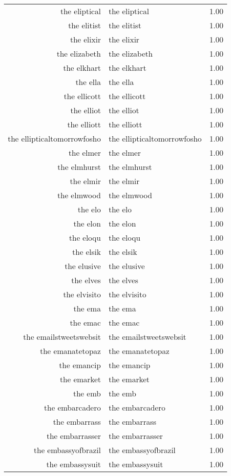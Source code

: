 \begin{table}[ht]
\begin{tabular}{rlr}
  the eliptical & the eliptical & 1.00 \\ 
  the elitist & the elitist & 1.00 \\ 
  the elixir & the elixir & 1.00 \\ 
  the elizabeth & the elizabeth & 1.00 \\ 
  the elkhart & the elkhart & 1.00 \\ 
  the ella & the ella & 1.00 \\ 
  the ellicott & the ellicott & 1.00 \\ 
  the elliot & the elliot & 1.00 \\ 
  the elliott & the elliott & 1.00 \\ 
  the ellipticaltomorrowfosho & the ellipticaltomorrowfosho & 1.00 \\ 
  the elmer & the elmer & 1.00 \\ 
  the elmhurst & the elmhurst & 1.00 \\ 
  the elmir & the elmir & 1.00 \\ 
  the elmwood & the elmwood & 1.00 \\ 
  the elo & the elo & 1.00 \\ 
  the elon & the elon & 1.00 \\ 
  the eloqu & the eloqu & 1.00 \\ 
  the elsik & the elsik & 1.00 \\ 
  the elusive & the elusive & 1.00 \\ 
  the elves & the elves & 1.00 \\ 
  the elvisito & the elvisito & 1.00 \\ 
  the ema & the ema & 1.00 \\ 
  the emac & the emac & 1.00 \\ 
  the emailstweetswebsit & the emailstweetswebsit & 1.00 \\ 
  the emanatetopaz & the emanatetopaz & 1.00 \\ 
  the emancip & the emancip & 1.00 \\ 
  the emarket & the emarket & 1.00 \\ 
  the emb & the emb & 1.00 \\ 
  the embarcadero & the embarcadero & 1.00 \\ 
  the embarrass & the embarrass & 1.00 \\ 
  the embarrasser & the embarrasser & 1.00 \\ 
  the embassyofbrazil & the embassyofbrazil & 1.00 \\ 
  the embassysuit & the embassysuit & 1.00 \\ 

\end{tabular}
\end{table}
